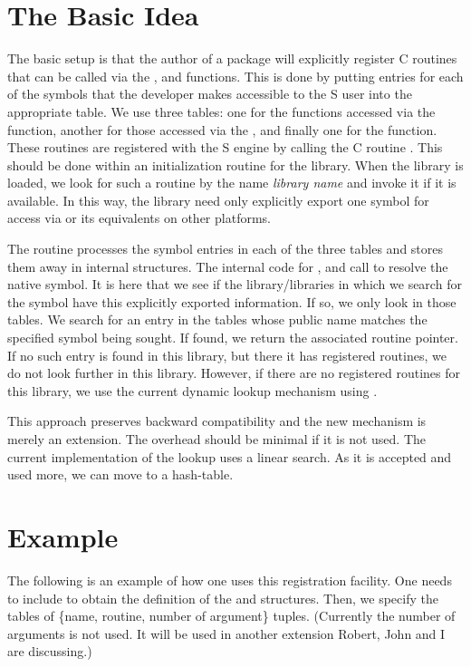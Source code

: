 \documentclass{article}
\begin{document}
\section{The Basic Idea}

The basic setup is that the author of a package will explicitly
register C routines that can be called via the ,
 and  functions. This is done by
putting entries for each of the symbols that the developer makes
accessible to the S user into the appropriate table.  We use three
tables: one for the functions accessed via the 
function, another for those accessed via the , and
finally one for the  function.  These routines are
registered with the S engine by calling the C routine
.  This should be done within an
initialization routine for the library.  When the library is loaded,
we look for such a routine by the name \textit{library
  name} and invoke it if it is available. In this way, the library
need only explicitly export one symbol for access via 
or its equivalents on other platforms.

The  routine processes the symbol
entries in each of the three tables and stores them away in internal
structures.  The internal code for , 
and  call  to resolve the
native symbol. It is here that we see if the library/libraries in
which we search for the symbol have this explicitly exported
information. If so, we only look in those tables.  We search for an
entry in the tables whose public name matches the specified symbol
being sought. If found, we return the associated routine pointer.  If
no such entry is found in this library, but there it has registered
routines, we do not look further in this library.  However, if there
are no registered routines for this library, we use the current
dynamic lookup mechanism using .

This approach preserves backward compatibility and the new mechanism
is merely an extension. The overhead should be minimal if it is not
used.  The current implementation of the lookup uses a linear search.
As it is accepted and used more, we can move to a hash-table.


\section{Example}
The following is an example of how one uses this registration
facility.  One needs to include  to obtain the
definition of the  and 
structures.  Then, we specify the tables of \{name, routine, number of
argument\} tuples. (Currently the number of arguments is not used.  It
will be used in another extension Robert, John and I are discussing.)
\end{document}
